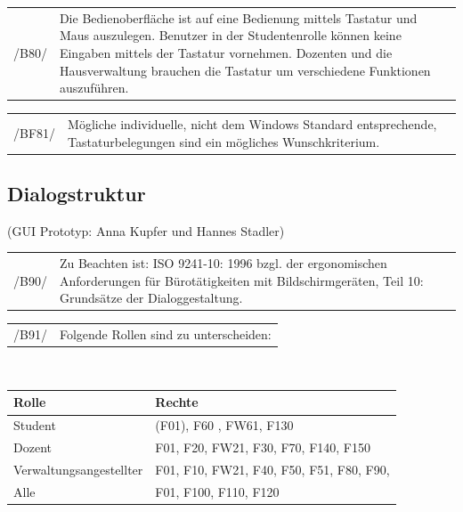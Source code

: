 \begin{tabular}{p{1.5cm}p{14.5cm}}
 /B80/	& Die Bedienoberfläche ist auf eine Bedienung mittels Tastatur und Maus auszulegen. Benutzer in der Studentenrolle können keine Eingaben mittels der Tastatur vornehmen. Dozenten und die Hausverwaltung brauchen die Tastatur um verschiedene Funktionen auszuführen. \\[0.25cm]	 
\end{tabular}

\begin{tabular}{p{1.5cm}p{14.5cm}}
 /BF81/	& Mögliche individuelle, nicht dem Windows Standard entsprechende, Tastaturbelegungen sind ein mögliches  Wunschkriterium. \\[0.25cm]	 
\end{tabular}


\subsection{Dialogstruktur}
(GUI Prototyp: Anna Kupfer und Hannes Stadler) \\

\begin{tabular}{p{1.5cm}p{14.5cm}}
 /B90/	& Zu Beachten ist: ISO 9241-10: 1996 bzgl. der ergonomischen Anforderungen für Bürotätigkeiten mit Bildschirmgeräten, Teil 10: Grundsätze der Dialoggestaltung. \\[0.25cm]	 
\end{tabular}

\begin{tabular}{p{1.5cm}p{14.5cm}}
 /B91/	& Folgende Rollen sind zu unterscheiden: \\[0.25cm]	 
\end{tabular}\\


\begin{table}[h]
\begin{tabular}{l|l}
Rolle&Rechte\\
\hline
\hline
Student & (F01), F60 , FW61, F130 \\
\hline
Dozent & F01, F20, FW21, F30, F70, F140, F150  \\
\hline
Verwaltungsangestellter & F01, F10, FW21, F40, F50, F51, F80, F90,  \\
\hline
Alle & F01, F100, F110, F120
\end{tabular}
\end{table}

